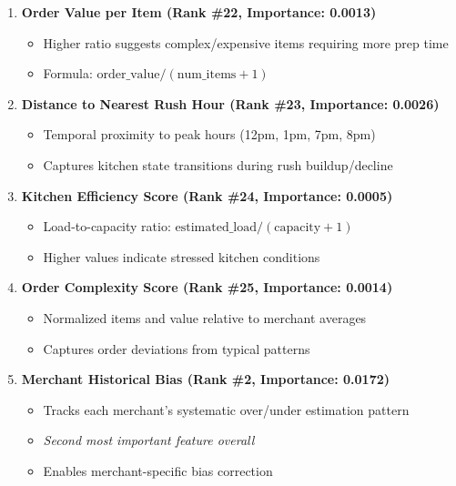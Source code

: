 \documentclass[11pt,a4paper]{article}
\begin{document}
\begin{enumerate}[leftmargin=*]
    \item \textbf{Order Value per Item (Rank \#22, Importance: 0.0013)}
    \begin{itemize}
        \item Higher ratio suggests complex/expensive items requiring more prep time
        \item Formula: $\text{order\_value} / (\text{num\_items} + 1)$
    \end{itemize}
    
    \item \textbf{Distance to Nearest Rush Hour (Rank \#23, Importance: 0.0026)}
    \begin{itemize}
        \item Temporal proximity to peak hours (12pm, 1pm, 7pm, 8pm)
        \item Captures kitchen state transitions during rush buildup/decline
    \end{itemize}
    
    \item \textbf{Kitchen Efficiency Score (Rank \#24, Importance: 0.0005)}
    \begin{itemize}
        \item Load-to-capacity ratio: $\text{estimated\_load} / (\text{capacity} + 1)$
        \item Higher values indicate stressed kitchen conditions
    \end{itemize}
    
    \item \textbf{Order Complexity Score (Rank \#25, Importance: 0.0014)}
    \begin{itemize}
        \item Normalized items and value relative to merchant averages
        \item Captures order deviations from typical patterns
    \end{itemize}
    
    \item \textbf{Merchant Historical Bias (Rank \#2, Importance: 0.0172)}
    \begin{itemize}
        \item Tracks each merchant's systematic over/under estimation pattern
        \item \textit{Second most important feature overall}
        \item Enables merchant-specific bias correction
    \end{itemize}
\end{enumerate}
\end{document}
